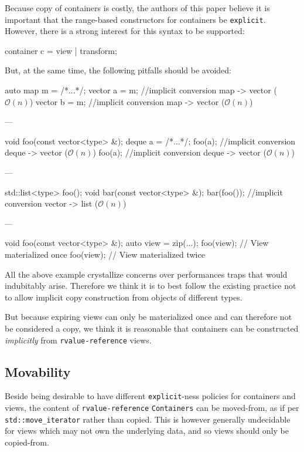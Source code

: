\documentclass{wg21}
\newcommand{\cc}[1]{\texttt{#1}}
\begin{document}
Because copy of containers is costly, the authors of this paper believe it is important that the range-based constructors for containers be \cc{explicit}.
However, there is a strong interest for this syntax to be supported:
\begin{codeblock}
    container c = view | transform;
\end{codeblock}

But, at the same time, the following pitfalls should be avoided:


\begin{codeblock}
    auto map m = /*...*/;
    vector a = m;  //implicit conversion map -> vector ($\mathcal{O}(n)$)
    vector b = m;  //implicit conversion map -> vector ($\mathcal{O}(n)$)
\end{codeblock}
---

\begin{codeblock}
    void foo(const vector<type> &);
    deque a =  /*...*/;
    foo(a);  //implicit conversion deque -> vector ($\mathcal{O}(n)$)
    foo(a);  //implicit conversion deque -> vector ($\mathcal{O}(n)$)
\end{codeblock}
---

\begin{codeblock}
    std::list<type> foo();
    void bar(const vector<type> &);
    bar(foo()); //implicit conversion vector -> list ($\mathcal{O}(n)$)
\end{codeblock}
---

\begin{codeblock}
    void foo(const vector<type> &);
    auto view = zip(...);
    foo(view); // View materialized once
    foo(view); // View materialized twice
\end{codeblock}

All the above example crystallize concerns over performances traps that would indubitably arise.
Therefore we think it is to best follow the existing practice not to allow implicit copy construction from objects of different types.

But because expiring views can only be materialized once and can therefore not be considered a copy, we think it is reasonable that
containers can be constructed \emph{implicitly} from \cc{rvalue-reference} views.

\subsection{Movability}

Beside being desirable to have different \cc{explicit}-ness policies for containers and views, the content of \cc{rvalue-reference} \cc{Containers}
can be moved-from, as if per \cc{std::move_iterator} rather than copied.
This is however generally undecidable for views which may not own the underlying data, and so views should only be copied-from.
\end{document}

